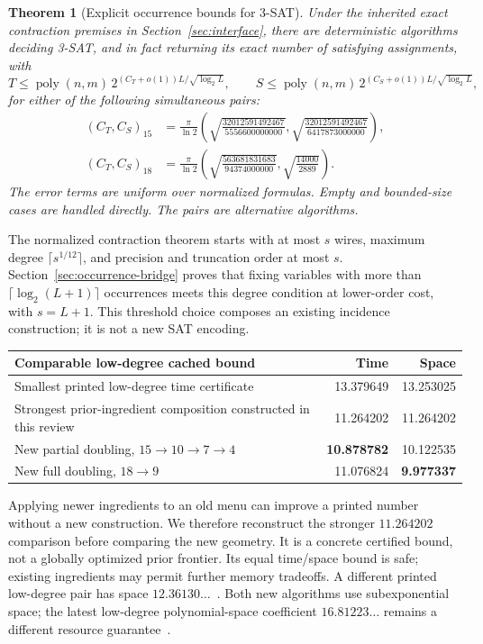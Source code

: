 \documentclass[11pt]{article}
\newtheorem{theorem}{Theorem}[section]
\newcommand{\poly}{\operatorname{poly}}
\begin{document}
\begin{theorem}[Explicit occurrence bounds for 3-SAT]
\label{thm:sat}
Under the inherited exact contraction premises in Section~\ref{sec:interface},
there are deterministic algorithms deciding 3-SAT, and in fact returning
its exact number of satisfying assignments, with
\[
 T\le\poly(n,m)\,2^{(C_T+o(1))L/\sqrt{\log_2 L}},\qquad
 S\le\poly(n,m)\,2^{(C_S+o(1))L/\sqrt{\log_2 L}},
\]
for either of the following simultaneous pairs:
\begin{align*}
 (C_T,C_S)_{15}&=\frac\pi{\ln2}
 \left(\sqrt{\frac{32012591492467}{5556600000000}},
       \sqrt{\frac{32012591492467}{6417873000000}}\right),\\
 (C_T,C_S)_{18}&=\frac\pi{\ln2}
 \left(\sqrt{\frac{563681831683}{94374000000}},
       \sqrt{\frac{14000}{2889}}\right).
\end{align*}
The error terms are uniform over normalized formulas. Empty and
bounded-size cases are handled directly. The pairs are alternative algorithms.
\end{theorem}

The normalized contraction theorem starts with at most $s$ wires, maximum
degree $\lceil s^{1/12}\rceil$, and precision and truncation order at most
$s$. Section~\ref{sec:occurrence-bridge} proves that fixing variables with
more than $\lceil\log_2(L+1)\rceil$ occurrences meets this degree condition
at lower-order cost, with $s=L+1$. This threshold choice composes an
existing incidence construction; it is not a new SAT encoding.

\begin{center}
\begin{tabular}{p{8.6cm}rr}
\toprule Comparable low-degree cached bound & Time & Space\\
\midrule
Smallest printed low-degree time certificate~\cite{bounds}&13.379649&13.253025\\
Strongest prior-ingredient composition constructed in this review&11.264202&11.264202\\
New partial doubling, $15\to10\to7\to4$&\textbf{10.878782}&10.122535\\
New full doubling, $18\to9$&11.076824&\textbf{9.977337}\\
\bottomrule
\end{tabular}
\end{center}

Applying newer ingredients to an old menu can improve a printed number
without a new construction. We therefore reconstruct the stronger
$11.264202$ comparison before comparing the new geometry. It is a concrete
certified bound, not a globally optimized prior frontier. Its equal
time/space bound is safe; existing ingredients may permit further memory
tradeoffs. A different printed low-degree pair has space
$12.36130\ldots$~\cite{project}. Both new algorithms use subexponential
space; the latest low-degree polynomial-space coefficient
$16.81223\ldots$ remains a different resource guarantee~\cite{pairwise}.
\end{document}
